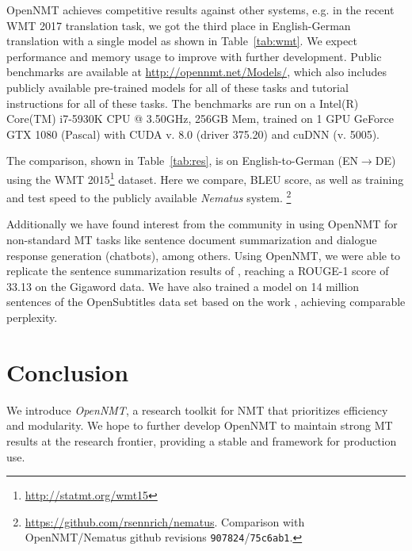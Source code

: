 \documentclass[]{article}
\begin{document}
OpenNMT achieves competitive results against other systems, e.g. in the recent WMT 2017 translation task, we got the third place in English-German translation with a single model as shown in Table~\ref{tab:wmt}. We expect performance and
memory usage to improve with further development.  Public benchmarks
are available at \url{http://opennmt.net/Models/}, which also includes
publicly available pre-trained models for all of these tasks and
tutorial instructions for all of these tasks. The benchmarks are
run on a Intel(R) Core(TM) i7-5930K CPU @ 3.50GHz, 256GB Mem,
trained on 1 GPU GeForce GTX 1080 (Pascal) with CUDA v. 8.0 (driver
375.20) and cuDNN (v. 5005).

The comparison, shown in Table~\ref{tab:res}, is on English-to-German
(EN$\rightarrow$DE) using the WMT
2015\footnote{\url{http://statmt.org/wmt15}} dataset. Here we compare,
BLEU score, as well as training and test speed to the publicly
available \textit{Nematus} system. 
\footnote{\url{https://github.com/rsennrich/nematus}. Comparison with
  OpenNMT/Nematus github revisions {\tt 907824}/{\tt 75c6ab1}.}


Additionally we have found interest from the community in using
OpenNMT for non-standard MT tasks like sentence document summarization and
dialogue response generation (chatbots), among others.  Using
OpenNMT, we were able to replicate the sentence summarization results
of \citet{chopra2016abstractive}, reaching a ROUGE-1 score of 33.13 on
the Gigaword data. We have also trained a model on 14 million
sentences of the OpenSubtitles data set based on the work
\citet{vinyals2015neural}, achieving comparable perplexity.













\section{Conclusion}

We introduce \textit{OpenNMT}, a research toolkit for NMT that
prioritizes efficiency and modularity. We hope to further develop
OpenNMT to maintain strong MT results at the research frontier, 
providing a stable and framework for production use.
\newpage
\small



\end{document}

